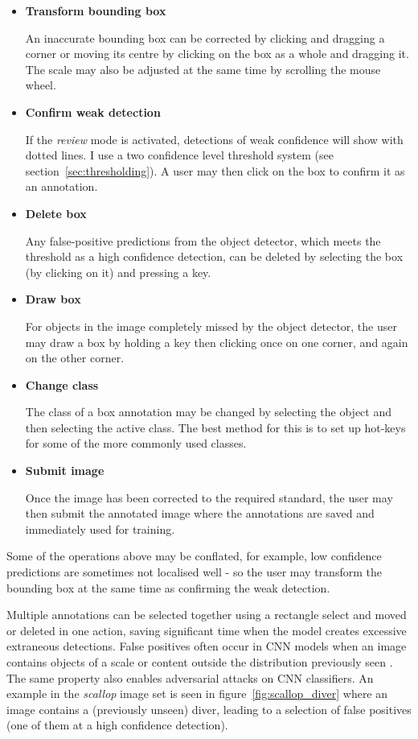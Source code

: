 \begin{itemize}
    \item {\bf Transform bounding box}\par
An inaccurate bounding box can be corrected by clicking and dragging a corner or moving its centre by clicking on the box as a whole and dragging it. The scale may also be adjusted at the same time by scrolling the mouse wheel.
    \item {\bf Confirm weak detection}\par
If the \emph{review} mode is activated, detections of weak confidence will show with dotted lines. I use a two confidence level threshold system (see section~\ref{sec:thresholding}). A user may then click on the box to confirm it as an annotation.
    \item {\bf Delete box}\par
Any false-positive predictions from the object detector, which meets the threshold as a high confidence detection, can be deleted by selecting the box (by clicking on it) and pressing a key. 
    \item {\bf Draw box}\par
For objects in the image completely missed by the object detector, the user may draw a box by holding a key then clicking once on one corner, and again on the other corner.
    \item {\bf Change class}\par
The class of a box annotation may be changed by selecting the object and then selecting the active class. The best method for this is to set up hot-keys for some of the more commonly used classes.
    \item {\bf Submit image}\par
Once the image has been corrected to the required standard, the user may then submit the annotated image where the annotations are saved and immediately used for training.
\end{itemize}

Some of the operations above may be conflated, for example, low confidence predictions are sometimes not localised well - so the user may transform the bounding box at the same time as confirming the weak detection.


Multiple annotations can be selected together using a rectangle select and moved or deleted in one action, saving significant time when the model creates excessive extraneous detections. False positives often occur in \gls{CNN} models when an image contains objects of a scale or content outside the distribution previously seen \cite{Hendrycks2016,Lee2018}. The same property also enables adversarial attacks on \gls{CNN} classifiers. An example in the \emph{scallop} image set is seen in figure~\ref{fig:scallop_diver} where an image contains a (previously unseen) diver, leading to a selection of false positives (one of them at a high confidence detection).


